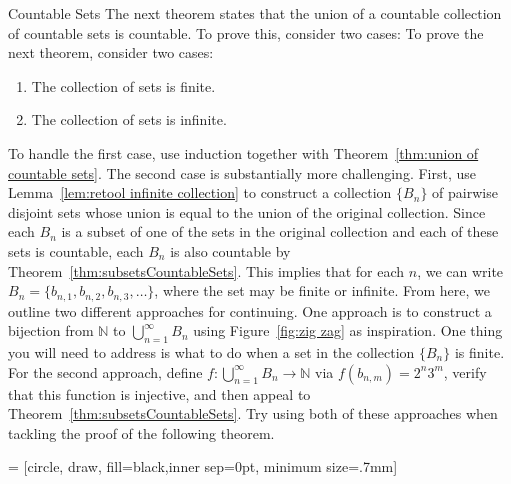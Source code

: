 \begin{section}{Countable Sets}
The next theorem states that the union of a countable collection of countable sets is countable. To prove this, consider two cases:
To prove the next theorem, consider two cases:
\begin{enumerate}
\item The collection of sets is finite.  
\item The collection of sets is infinite.
\end{enumerate}
To handle the first case, use induction together with Theorem~\ref{thm:union of countable sets}. The second case is substantially more challenging.  First, use Lemma~\ref{lem:retool infinite collection} to construct a collection $\{B_n\}$ of pairwise disjoint sets whose union is equal to the union of the original collection. Since each $B_n$ is a subset of one of the sets in the original collection and each of these sets is countable, each $B_n$ is also countable by Theorem~\ref{thm:subsetsCountableSets}. This implies that for each $n$, we can write $B_n=\{b_{n,1}, b_{n,2},b_{n,3},\ldots\}$, where the set may be finite or infinite. From here, we outline two different approaches for continuing.  One approach is to construct a bijection from $\mathbb{N}$ to $\bigcup_{n=1}^{\infty}B_n$ using Figure~\ref{fig:zig zag} as inspiration.  One thing you will need to address is what to do when a set in the collection $\{B_n\}$ is finite. For the second approach, define $f:\bigcup_{n=1}^{\infty}B_n\to \mathbb{N}$ via $f(b_{n,m})=2^n3^m$, verify that this function is injective, and then appeal to Theorem~\ref{thm:subsetsCountableSets}.  Try using both of these approaches when tackling the proof of the following theorem.

 = [circle, draw, fill=black,inner sep=0pt, minimum size=.7mm]

\begin{figure}[h!]
\centering
{}
\end{figure}
\end{section}
